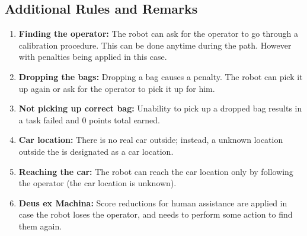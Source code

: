 \subsection*{Additional Rules and Remarks}
\begin{enumerate}[nosep]

    \item \textbf{Finding the operator:} The robot can ask for the operator to go through a calibration procedure. This can be done anytime during the path. However with penalties being applied in this case.
    
    \item \textbf{Dropping the bags:} Dropping a bag causes a penalty. The robot can pick it up again or ask for the operator to pick it up for him.
    
    \item \textbf{Not picking up correct bag:} Unability to pick up a dropped bag results in a task failed and 0 points total earned.

	\item \textbf{Car location:} There is no real car outside; instead, a unknown location outside the \Arena{} is designated as a car location.

	\item \textbf{Reaching the car:} The robot can reach the car location only by following the operator (the car location is unknown).

	\item \textbf{Deus ex Machina:} Score reductions for human assistance are applied in case the robot loses the operator, and needs to perform some action to find them again. %
\end{enumerate}


